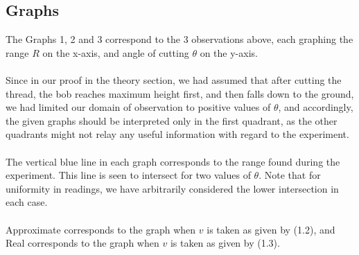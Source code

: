 \subsection{Graphs}
The Graphs 1, 2 and 3 correspond to the 3 observations above, each graphing the range $R$ on the x-axis, and angle of cutting $\theta$ on the y-axis.
\\ \\
Since in our proof in the theory section, we had assumed that after cutting the thread, the bob reaches maximum height first, and then falls down to the ground, we had limited our domain of observation to positive values of $\theta$, and accordingly, the given graphs should be interpreted only in the first quadrant, as the other quadrants might not relay any useful information with regard to the experiment.
\\ \\
The vertical blue line in each graph corresponds to the range found during the experiment. This line is seen to intersect for two values of $\theta$. Note that for uniformity in readings, we have arbitrarily considered the lower intersection in each case.
\\ \\
Approximate corresponds to the graph when $v$ is taken as given by (1.2), and Real corresponds to the graph when $v$ is taken as given by (1.3).
